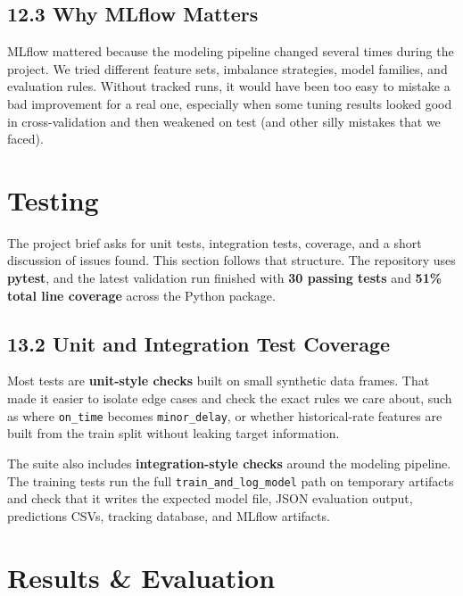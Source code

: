 \documentclass{article}
\newcommand{\code}[1]{\texttt{\small #1}}
\begin{document}
\subsection*{\textcolor{accentgold}{12.3 Why MLflow Matters}}

MLflow mattered because the modeling pipeline changed several times during the project. We tried different feature sets, imbalance strategies, model families, and evaluation rules. Without tracked runs, it would have been too easy to mistake a bad improvement for a real one, especially when some tuning results looked good in cross-validation and then weakened on test (and other silly mistakes that we faced).


\section{\textcolor{accentblue}{Testing}}

The project brief asks for unit tests, integration tests, coverage, and a short discussion of issues found. This section follows that structure. The repository uses \textbf{pytest}, and the latest validation run finished with \textbf{30 passing tests} and \textbf{51\% total line coverage} across the Python package.


\subsection*{\textcolor{accentgold}{13.2 Unit and Integration Test Coverage}}

Most tests are \textbf{unit-style checks} built on small synthetic data frames. That made it easier to isolate edge cases and check the exact rules we care about, such as where \code{on\_time} becomes \code{minor\_delay}, or whether historical-rate features are built from the train split without leaking target information.

The suite also includes \textbf{integration-style checks} around the modeling pipeline. The training tests run the full \code{train\_and\_log\_model} path on temporary artifacts and check that it writes the expected model file, JSON evaluation output, predictions CSVs, tracking database, and MLflow artifacts. 

\section{\textcolor{accentblue}{Results \& Evaluation}}
\end{document}
